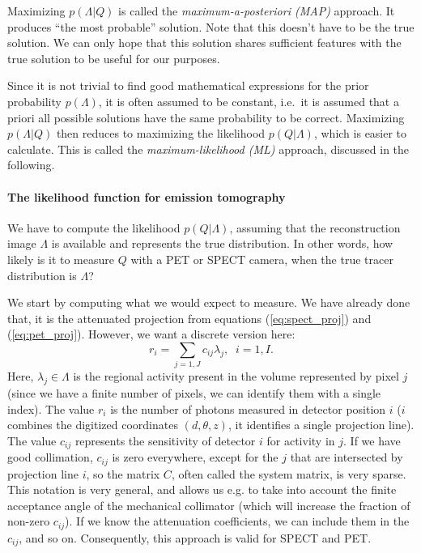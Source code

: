 \documentclass[11pt,oneside]{article}
\begin{document}
Maximizing $p(\Lambda | Q)$ is called the {\em maximum-a-posteriori (MAP)}
approach. It produces ``the most probable'' solution. Note that this doesn't
have to be the true solution. We can only hope that this solution shares
sufficient features with the true solution to be useful for our purposes.

Since it is not trivial to find good mathematical expressions for the prior
probability $p(\Lambda)$, it is often assumed to be constant, i.e.\ it is
assumed that a priori all possible solutions have the same probability to be
correct.  Maximizing $p(\Lambda | Q)$ then reduces to maximizing the
likelihood $p(Q | \Lambda)$, which is easier to calculate.  This is called the
{\em maximum-likelihood (ML)} approach, discussed in the following.

\paragraph{The likelihood function for emission tomography}
We have to compute the likelihood $p(Q | \Lambda)$, assuming that the
reconstruction image $\Lambda$ is available and represents the true
distribution. In other words, how likely is it to measure $Q$ with a PET or
SPECT camera, when the true tracer distribution is $\Lambda$?

We start by computing what we would expect to measure. We have already
done that, it is the attenuated projection from equations
(\ref{eq:spect_proj}) and (\ref{eq:pet_proj}). However, we want a
discrete version here:
\begin{equation}
  r_i = \sum_{j=1,J} c_{ij} \lambda_j, \;\; i = 1,I.  \label{jn:mlproj}
\end{equation}
Here, $\lambda_j \in \Lambda$ is the regional activity present in the
volume represented by pixel $j$ (since we have a finite number of
pixels, we can identify them with a single index). The value $r_i$ is
the number of photons measured in detector position $i$ ($i$ combines
the digitized coordinates $(d,\theta,z)$, it identifies a single
projection line). The value $c_{ij}$ represents the sensitivity of
detector $i$ for activity in $j$. If we have good collimation,
$c_{ij}$ is zero everywhere, except for the $j$ that are intersected
by projection line $i$, so the matrix $C$, often called the system
matrix, is very sparse. This notation is very general, and allows us
e.g. to take into account the finite acceptance angle of the
mechanical collimator (which will increase the fraction of non-zero
$c_{ij}$). If we know the attenuation coefficients, we can include
them in the $c_{ij}$, and so on. Consequently, this approach is valid
for SPECT and PET.
\end{document}
